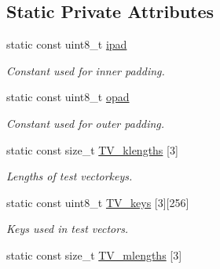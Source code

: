 \subsection*{Static Private Attributes}
\begin{DoxyCompactItemize}
\item 
\hypertarget{classHMAC_aa7914ba2ff1d879dd20b25149d169b59}{}static const uint8\+\_\+t \hyperlink{classHMAC_aa7914ba2ff1d879dd20b25149d169b59}{ipad}\label{classHMAC_aa7914ba2ff1d879dd20b25149d169b59}

\begin{DoxyCompactList}\small\item\em Constant used for inner padding. \end{DoxyCompactList}\item 
\hypertarget{classHMAC_aad108fdf696c1f3c770bcd425b632f68}{}static const uint8\+\_\+t \hyperlink{classHMAC_aad108fdf696c1f3c770bcd425b632f68}{opad}\label{classHMAC_aad108fdf696c1f3c770bcd425b632f68}

\begin{DoxyCompactList}\small\item\em Constant used for outer padding. \end{DoxyCompactList}\item 
\hypertarget{classHMAC_abc7fa897f42fb4c2f70633a634c9bf11}{}static const size\+\_\+t \hyperlink{classHMAC_abc7fa897f42fb4c2f70633a634c9bf11}{T\+V\+\_\+klengths} \mbox{[}3\mbox{]}\label{classHMAC_abc7fa897f42fb4c2f70633a634c9bf11}

\begin{DoxyCompactList}\small\item\em Lengths of test vectorkeys. \end{DoxyCompactList}\item 
\hypertarget{classHMAC_ab2669ec492cb8f6d8d27e2141b016f52}{}static const uint8\+\_\+t \hyperlink{classHMAC_ab2669ec492cb8f6d8d27e2141b016f52}{T\+V\+\_\+keys} \mbox{[}3\mbox{]}\mbox{[}256\mbox{]}\label{classHMAC_ab2669ec492cb8f6d8d27e2141b016f52}

\begin{DoxyCompactList}\small\item\em Keys used in test vectors. \end{DoxyCompactList}\item 
\hypertarget{classHMAC_a6c6bd95626e896c105c6506ad5103b99}{}static const size\+\_\+t \hyperlink{classHMAC_a6c6bd95626e896c105c6506ad5103b99}{T\+V\+\_\+mlengths} \mbox{[}3\mbox{]}\label{classHMAC_a6c6bd95626e896c105c6506ad5103b99}


\end{DoxyCompactItemize}
